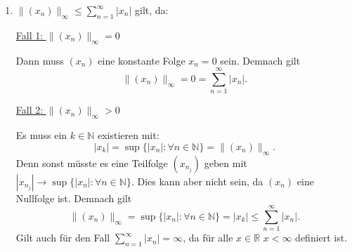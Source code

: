 \documentclass[a4paper,12pt]{article}
\begin{document}
\begin{enumerate}[label=\alph*)]
    \item
    $\|(x_n)\|_\infty \leq \displaystyle\sum_{n=1}^{\infty} |x_n|$ gilt, da:

    \underline{Fall 1: $\|(x_n)\|_\infty = 0$}

    Dann muss $(x_n)$ eine konstante Folge $x_n = 0$ sein.
    Demnach gilt
    \[
        \|(x_n)\|_\infty = 0 = \sum_{n=1}^{\infty} |x_n|.
    \]

    \underline{Fall 2: $\|(x_n)\|_\infty > 0$}

    Es muss ein $k \in \mathbb{N}$ existieren mit:
    \[
        |x_k| = \sup\{|x_n| : \forall n \in \mathbb{N}\} = \|(x_n)\|_\infty.
    \]
    Denn sonst müsste es eine Teilfolge $(x_{n_j})$ geben mit
    $|x_{n_j}| \to \sup\{|x_n| : \forall n \in \mathbb{N}\}$.
    Dies kann aber nicht sein, da $(x_n)$ eine Nullfolge ist.
    Demnach gilt
    \[
        \|(x_n)\|_\infty = \sup\{|x_n| : \forall n \in \mathbb{N}\} = |x_k| \leq \sum_{n=1}^{\infty} |x_n|.
    \]
    Gilt auch für den Fall $\displaystyle\sum_{n=1}^{\infty} |x_n| = \infty$,
    da für alle $x \in \mathbb{R}$ $x < \infty$ definiert ist.

\end{enumerate}
\end{document}
